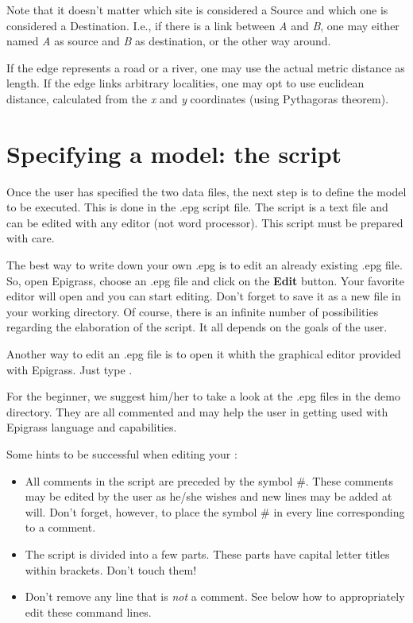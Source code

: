 \documentclass[a4paper,10pt]{manual}
\begin{document}
Note that it doesn't matter which site is considered a Source and which one is considered a Destination. I.e., if there is a link between \emph{A} and \emph{B}, one may either named \emph{A} as source and \emph{B} as destination, or the other way around.

If the edge represents a road or a river, one may use the actual metric distance as length. If the edge links arbitrary localities, one may opt to use euclidean distance, calculated from the \emph{x} and \emph{y} coordinates (using Pythagoras theorem).


\section{Specifying a model: the script}

Once the user has specified the two data files, the next step is to define the model to be executed. This is done in the .epg script file. The    script is a text file and can be edited with any editor (not word processor). This script must be prepared with care.

The best way to write down your own .epg is to edit an already existing .epg file. So, open Epigrass, choose an .epg file and click on the \textbf{Edit} button. Your favorite editor will open and you can start editing. Don't forget to save it as a new file in your working directory. Of course, there is an infinite number of possibilities regarding the elaboration of the script. It all depends on the goals of the user.

\begin{notice}[note]
Another way to edit an .epg file is to open it whith the graphical editor provided with Epigrass. Just type .
\end{notice}

For the beginner, we suggest him/her to take a look at the .epg files in the demo directory. They are all commented and may help the user in getting used with Epigrass language and capabilities.

Some hints to be successful when editing your   :
\begin{itemize}
\item {} 
All comments in the script are preceded by the symbol \#. These comments may be edited by the user as he/she wishes and new lines may be added at will. Don't forget, however, to place the symbol \# in every line corresponding to a comment.

\item {} 
The script is divided into a few parts. These parts have capital letter titles within brackets. Don't touch them!

\item {} 
Don't remove any line that is \emph{not} a comment. See below how to appropriately edit these command lines.

\end{itemize}
\end{document}
